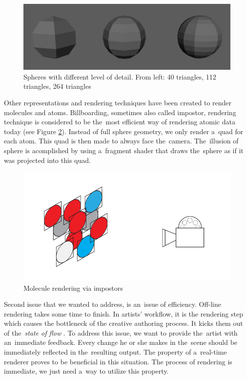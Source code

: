 \documentclass[
  digital, %
  table,   %
  nolof,     %
  nolot,     %
  oneside,
]{fithesis3}
\begin{document}
\begin{figure}
  \centering
  \includegraphics[scale=0.3]{images/spheres.png}
  \caption{Spheres with different level of detail. From left: 40 triangles, 112 triangles, 264 triangles}
  \label{fig:spheres-lod}
\end{figure}

Other representations and rendering techniques have been created to render molecules and atoms. Billboarding, sometimes also called impostor, rendering technique is considered to be the most efficient way of rendering atomic data today (see Figure \ref{fig:impostor-rendering}). Instead of full sphere geometry, we only render a quad for each atom. This quad is then made to always face the camera. The illusion of sphere is acomplished by using a fragment shader that draws the sphere as if it was projected into this quad.

\begin{figure}
  \centering
  \includegraphics[scale=0.8]{images/billboards.pdf}
  \caption{Molecule rendering via impostors}
  \label{fig:impostor-rendering}
\end{figure}

Second issue that we wanted to address, is an issue of efficiency. Off-line rendering takes some time to finish. In artists' workflow, it is the rendering step which causes the bottleneck of the creative authoring process. It kicks them out of the \textit{state of flow} \cite{FlowTheoryandResearch}. To address this issue, we want to provide the artist with an immediate feedback. Every change he or she makes in the scene should be immediately reflected in the resulting output. The property of a real-time renderer proves to be beneficial in this situation. The process of rendering is immediate, we just need a way to utilize this property.
\end{document}
